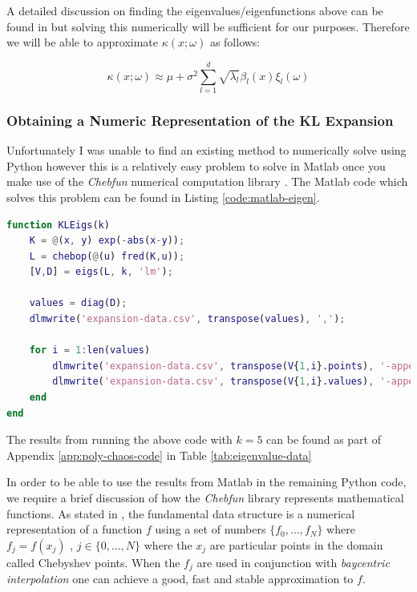 A detailed discussion on finding the eigenvalues/eigenfunctions above can be
found in \cite{stochastic-fem} but solving this numerically will be sufficient
for our purposes. Therefore we will be able to approximate $\kappa(x;\omega)$
as follows:

\begin{equation}\label{eq:oned-stochastic-kl-kappa}
    \kappa(x;\omega) \approx
        \mu + \sigma^2\sum_{l=1}^d\sqrt{\lambda_l}\beta_l(x)\xi_l(\omega)
\end{equation}

\subsubsection{Obtaining a Numeric Representation of the KL Expansion}

Unfortunately I was unable to find an existing method to numerically solve
 using Python however this is
a relatively easy problem to solve in Matlab once you make use of the
\textit{Chebfun} numerical computation library \cite{chebfun}. The Matlab code
which solves this problem can be found in Listing \ref{code:matlab-eigen}.

\begin{lstlisting}[caption={Matlab code which finds the first 5 eigenvalues and
                            associated eigenfunctions},
                   label={code:matlab-eigen},
                   language=Matlab]
function KLEigs(k)
    K = @(x, y) exp(-abs(x-y));
    L = chebop(@(u) fred(K,u));
    [V,D] = eigs(L, k, 'lm');

    values = diag(D);
    dlmwrite('expansion-data.csv', transpose(values), ',');

    for i = 1:len(values)
        dlmwrite('expansion-data.csv', transpose(V{1,i}.points), '-append', 'delimiter', ',');
        dlmwrite('expansion-data.csv', transpose(V{1,i}.values), '-append', 'delimiter', ',');
    end
end
\end{lstlisting}

The results from running the above code with $k = 5$ can be found as part of
Appendix \ref{app:poly-chaos-code} in Table \ref{tab:eigenvalue-data}

In order to be able to use the results from Matlab in the remaining Python
code, we require a brief discussion of how the \textit{Chebfun} library
represents mathematical functions. As stated in \cite{chebfun-data}, the
fundamental data structure  is a numerical representation of a
function $f$ using a set of numbers $\{f_0, \ldots, f_N\}$ where $f_j = f(x_j)$
, $j \in \{0, \ldots, N\}$ where the $x_j$ are particular points in the domain
called Chebyshev points. When the $f_j$ are used in conjunction with
\textit{baycentric interpolation} one can achieve a good, fast and stable
approximation to $f$.

